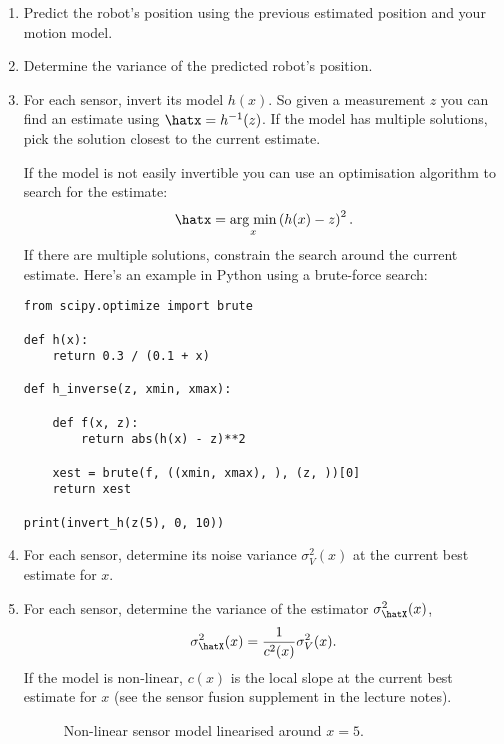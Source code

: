 \documentclass[a4paper, 12pt]{article}
\newcommand{\est}[1]{\expandafter\hat#1}
\newcommand{\var}[1]{\sigma_{#1}^2}
\newcommand{\argmin}{\mathop{\rm arg\;min}}
\newcommand{\encp}[1]{\left(#1\right)}
\begin{document}
\begin{enumerate}
\item Predict the robot's position using the previous estimated
  position and your motion model.

\item Determine the variance of the predicted robot's position.

\item For each sensor, invert its model $h(x)$.  So given a
  measurement $z$ you can find an estimate using $\est{x} =
  h^{-1}(z)$.  If the model has multiple solutions, pick the solution
  closest to the current estimate.

  If the model is not easily invertible you can use an optimisation
  algorithm to search for the estimate:
  \begin{equation}
    \est{x} = \argmin_x \encp{h(x) - z}^2.
  \end{equation}
  If there are multiple solutions, constrain the search around the
  current estimate.  Here's an example in Python using a brute-force
  search:

  \begin{verbatim}
from scipy.optimize import brute

def h(x):
    return 0.3 / (0.1 + x)

def h_inverse(z, xmin, xmax):

    def f(x, z):
        return abs(h(x) - z)**2

    xest = brute(f, ((xmin, xmax), ), (z, ))[0]
    return xest

print(invert_h(z(5), 0, 10))
  \end{verbatim}

\item For each sensor, determine its noise variance $\var{V}(x)$ at
  the current best estimate for $x$.

\item For each sensor, determine the variance of the estimator
  $\var{\est{X}}(x)$,
  \begin{equation}
    \var{\est{X}}(x) = \frac{1}{c^2(x)} \var{V}(x).
  \end{equation}
  If the model is non-linear, $c(x)$ is the local slope at the current
  best estimate for $x$ (see the sensor fusion supplement in the lecture notes).

  \begin{figure}[!h]
  \centering
  
  \caption{Non-linear sensor model linearised around $x=5$.}
  \label{fig:linearised}
  \end{figure}


\end{enumerate}
\end{document}
